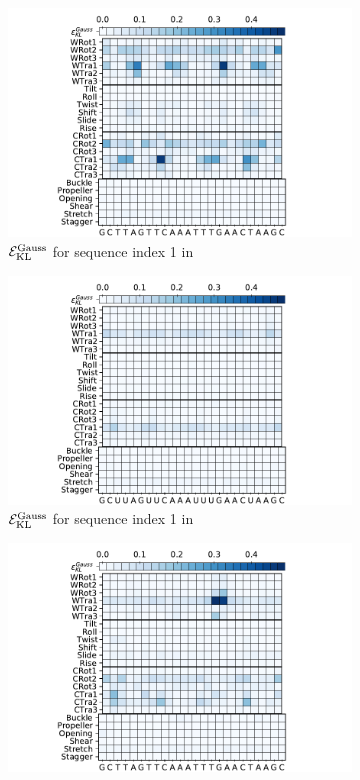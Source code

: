 \begin{figure}[H]
  \begin{subfigure}{15cm}
    \centering\includegraphics[width=11cm, trim=0cm 0cm 0cm 0.7cm]{images/Gaussian_error_DNA_1.pdf}
    \caption{${\mathcal E}_{\text{KL}}^{\text{Gauss}}$ for sequence index 1 in \Lbdna}
  \end{subfigure}
  \begin{subfigure}{15cm}
    \centering\includegraphics[width=11cm]{images/Gaussian_error_RNA_1.pdf}
    \caption{${\mathcal E}_{\text{KL}}^{\text{Gauss}}$ for sequence index 1 in \Lbrna}
  \end{subfigure}
  \begin{subfigure}{15cm}
    \centering\includegraphics[width=11cm]{images/Gaussian_error_DRH_1.pdf}

\end{subfigure}
\end{figure}
